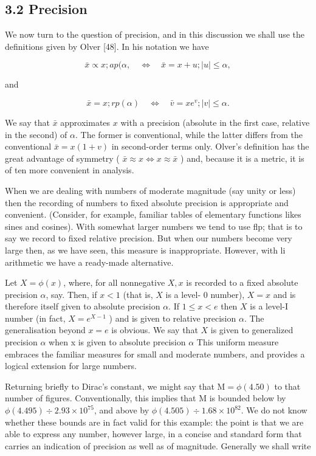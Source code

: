 \documentclass[10pt]{article}
\begin{document}
\subsection*{3.2 Precision}
We now turn to the question of precision, and in this discussion we shall use the definitions given by Olver [48]. In his notation we have

$$
\bar{x} \propto x ; a p(\alpha, \quad \Leftrightarrow \quad \bar{x}=x+u ;|u| \leqslant \alpha,
$$

and

$$
\bar{x}=x ; r p(\alpha) \quad \Leftrightarrow \quad \bar{v}=x e^{v} ;|v| \leqslant \alpha .
$$

We say that $\bar{x}$ approximates $x$ with a precision (absolute in the first case, relative in the second) of $\alpha$. The former is conventional, while the latter differs from the conventional $\bar{x}=x(1+v)$ in second-order terms only. Olver's definition has the great advantage of symmetry ( $\bar{x} \approx x \Leftrightarrow x \approx \bar{x}$ ) and, because it is a metric, it is of ten more convenient in analysis.

When we are dealing with numbers of moderate magnitude (say unity or less) then the recording of numbers to fixed absolute precision is appropriate and convenient. (Consider, for example, familiar tables of elementary functions likes sines and cosines). With somewhat larger numbers we tend to use flp; that is to say we record to fixed relative precision. But when our numbers become very large then, as we have seen, this measure is inappropriate. However, with li arithmetic we have a ready-made alternative.

Let $X=\phi(x)$, where, for all nonnegative $X, x$ is recorded to a fixed absolute precision $\alpha$, say. Then, if $x<1$ (that is, $X$ is a level- 0 number), $X=x$ and is therefore itself given to absolute precision $\alpha$. If $1 \leqslant x<e$ then $X$ is a level-I number (in fact, $X=e^{X-1}$ ) and is given to relative precision $\alpha$. The generalisation beyond $x=e$ is obvious. We say that $X$ is given to generalized precision $\alpha$ when x is given to absolute precision $\alpha$ This uniform measure embraces the familiar measures for small and moderate numbers, and provides a logical extension for large numbers.

Returning briefly to Dirac's constant, we might say that $\mathrm{M}=\phi(4.50)$ to that number of figures. Conventionally, this implies that M is bounded below by $\phi(4.495) \div 2.93 \times 10^{75}$, and above by $\phi(4.505) \div 1.68 \times 10^{82}$. We do not know whether these bounds are in fact valid for this example: the point is that we are able to express any number, however large, in a concise and standard form that carries an indication of precision as well as of magnitude. Generally we shall write
\end{document}
